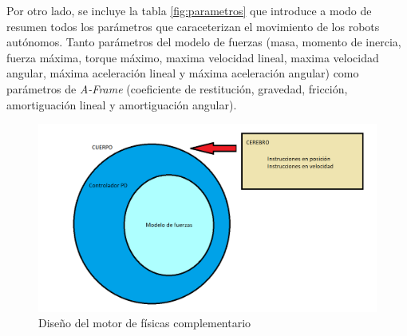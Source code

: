 Por otro lado, se incluye la tabla \ref{fig:parametros} que introduce a modo de resumen todos los parámetros que caraceterizan el movimiento
de los robots autónomos. Tanto parámetros del modelo de fuerzas (masa, momento de inercia, fuerza máxima, torque máximo, maxima velocidad lineal, maxima velocidad angular, máxima aceleración lineal y máxima aceleración angular) como parámetros de \textit{A-Frame} (coeficiente de restitución, gravedad, fricción, amortiguación lineal y amortiguación angular).

\begin{figure}[h!]
    \centering
    \includegraphics[scale=0.7]{Diseño_motor_4.PNG}
    \caption[Diseño del motor de físicas complementario]{Diseño del motor de físicas complementario\footnotemark}
    \label{fig:motor_diseño}
\end{figure}

